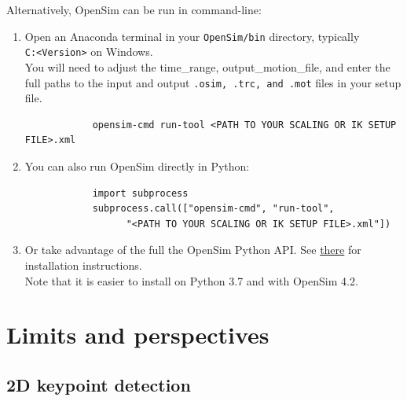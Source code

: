 Alternatively, OpenSim can be run in command-line:
\begin{enumerate}[itemsep=0em, topsep=0em, leftmargin=*]
      \item Open an Anaconda terminal in your \texttt{OpenSim/bin} directory, typically \\\texttt{C:\OpenSim <Version>\bin} on Windows.\\
      You will need to adjust the time\_range, output\_motion\_file, and enter the full paths to the input and output \texttt{.osim, .trc, and .mot} files in your setup file.
      \begin{verbatim}        
            opensim-cmd run-tool <PATH TO YOUR SCALING OR IK SETUP FILE>.xml
      \end{verbatim}

      \item You can also run OpenSim directly in Python:
      \begin{verbatim}
            import subprocess
            subprocess.call(["opensim-cmd", "run-tool", 
                  "<PATH TO YOUR SCALING OR IK SETUP FILE>.xml"])
      \end{verbatim}
      
      \item Or take advantage of the full the OpenSim Python API. See \href{https://simtk-confluence.stanford.edu:8443/display/OpenSim/Scripting+in+Python}{there} for installation instructions.\\
      Note that it is easier to install on Python 3.7 and with OpenSim 4.2.

\end{enumerate}



\section{Limits and perspectives} \label{ch3_lim}

\subsection{2D keypoint detection}

